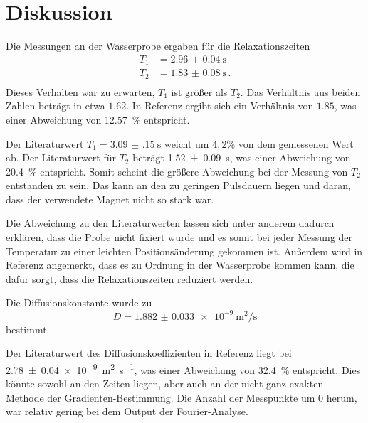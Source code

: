 \section{Diskussion}

Die Messungen an der Wasserprobe ergaben für die Relaxationszeiten
\begin{align*}
    T_1 &= \SI{2.96(4)}{\second} \\
    T_2 &= \SI{1.83(8)}{\second} \,. \\
\end{align*}
Dieses Verhalten war zu erwarten, $T_1$ ist größer als $T_2$. 
Das Verhältnis aus beiden Zahlen beträgt in etwa $\num{1.62}$. 
In Referenz \cite{chang} ergibt sich ein Verhältnis von $\num{1.85}$, was einer Abweichung von \SI{12.57}{\percent} entspricht. 

Der Literaturwert $T_1=\SI{3.09(15)}{\second}$ weicht um $4,2\%$ von dem gemessenen Wert ab.
Der Literaturwert für $T_2$ beträgt \SI{1.52(9)}{\second}, was einer Abweichung von \SI{20.4}{\percent} entspricht. 
Somit scheint die größere Abweichung bei der Messung von $T_2$ entstanden zu sein. Das kann an den zu geringen Pulsdauern liegen und daran, dass der verwendete Magnet nicht so stark war.

Die Abweichung zu den Literaturwerten lassen sich unter anderem dadurch erklären, dass die Probe nicht fixiert wurde und es somit bei jeder Messung der Temperatur zu einer leichten Positionsänderung gekommen ist.
Außerdem wird in Referenz \cite{chang} angemerkt, dass es zu Ordnung in der Wasserprobe kommen kann, die dafür sorgt, dass die Relaxationszeiten reduziert werden. 

Die Diffusionskonstante wurde zu 
\begin{equation*}
    D = \SI{1.882(33)e-9}{\meter\squared\per\second}
    \end{equation*}
bestimmt. 

Der Literaturwert des Diffusionskoeffizienten in Referenz \cite{chang} liegt bei \SI{2.78(4)e-9}{\meter\squared\per\second}, was einer Abweichung von \SI{32.4}{\percent} entspricht. Dies könnte sowohl an den Zeiten liegen, aber auch an der nicht ganz exakten Methode der Gradienten-Bestimmung. Die Anzahl der Messpunkte um \num{0} herum, war relativ gering bei dem Output der Fourier-Analyse. 




